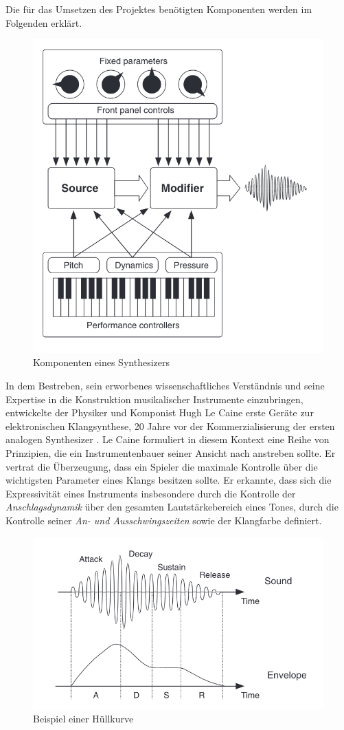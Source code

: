 \documentclass[
  a4paper,  %
  twoside,  %
  bibliography=totoc,
  headsepline,
  cleardoublepage=empty,
  parskip=half,
  draft=false
]{scrbook}
\begin{document}
Die für das Umsetzen des Projektes benötigten Komponenten werden im Folgenden erklärt. 

\begin{figure}[h]
  \centering
  \includegraphics[width=.5\textwidth]{graphics/synthstruc.png}
  \caption[Synth]{Komponenten eines Synthesizers \cite{russ_sound_2009}}
  \label{fig:synth}
\end{figure}

In dem Bestreben, sein erworbenes wissenschaftliches Verständnis und seine Expertise in die Konstruktion musikalischer Instrumente einzubringen, entwickelte der Physiker und Komponist Hugh Le Caine erste Geräte zur elektronischen Klangsynthese, 20 Jahre vor der Kommerzialisierung der ersten analogen Synthesizer \cite{young_gale_hugh_2013}. Le Caine formuliert in diesem Kontext eine Reihe von Prinzipien, die ein Instrumentenbauer seiner Ansicht nach anstreben sollte. Er vertrat die Überzeugung, dass ein Spieler die maximale Kontrolle über die wichtigsten Parameter eines Klangs besitzen sollte. Er erkannte, dass sich die Expressivität eines Instruments insbesondere durch die Kontrolle der \emph{Anschlagsdynamik} über den gesamten Lautstärkebereich eines Tones, durch die Kontrolle seiner \emph{An- und Ausschwingszeiten} sowie der Klangfarbe definiert. \cite{ruschkowski_elektronische_2019}

\begin{figure}[h]
  \centering
  \includegraphics[width=.7\textwidth]{graphics/ADSR.png}
  \caption[ADSR]{Beispiel einer Hüllkurve \cite{russ_sound_2009}}
  \label{fig:adsr}
\end{figure}
\end{document}
